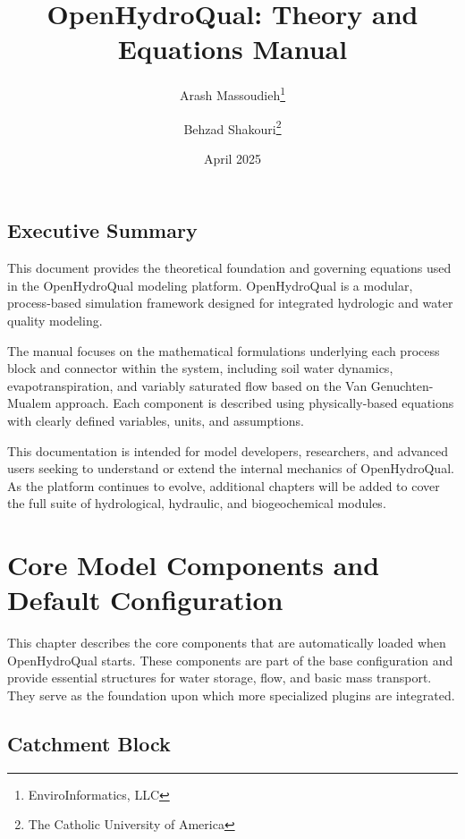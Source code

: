 \documentclass[12pt]{report}
\title{OpenHydroQual: Theory and Equations Manual}
\author{
Arash Massoudieh\thanks{EnviroInformatics, LLC} \and 
Behzad Shakouri\thanks{The Catholic University of America}
}
\date{April 2025}
\begin{document}
\maketitle

\section*{Executive Summary}


This document provides the theoretical foundation and governing equations used in the OpenHydroQual modeling platform. OpenHydroQual is a modular, process-based simulation framework designed for integrated hydrologic and water quality modeling.

The manual focuses on the mathematical formulations underlying each process block and connector within the system, including soil water dynamics, evapotranspiration, and variably saturated flow based on the Van Genuchten-Mualem approach. Each component is described using physically-based equations with clearly defined variables, units, and assumptions.

This documentation is intended for model developers, researchers, and advanced users seeking to understand or extend the internal mechanics of OpenHydroQual. As the platform continues to evolve, additional chapters will be added to cover the full suite of hydrological, hydraulic, and biogeochemical modules.


\tableofcontents

\chapter{Core Model Components and Default Configuration}

This chapter describes the core components that are automatically loaded when OpenHydroQual starts. These components are part of the base configuration and provide essential structures for water storage, flow, and basic mass transport. They serve as the foundation upon which more specialized plugins are integrated.

\section{Catchment Block}
\end{document}
